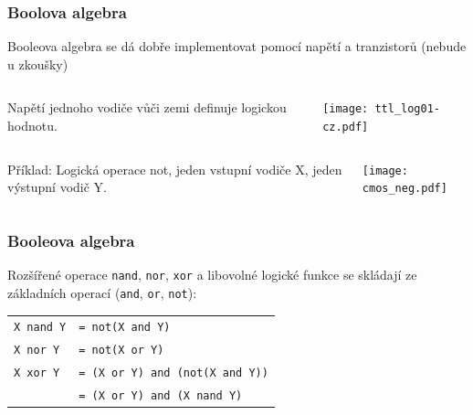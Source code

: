 \documentclass{beamer}
\begin{document}
\begin{frame}
\frametitle{Boolova algebra}

Booleova algebra se dá dobře implementovat pomocí napětí a tranzistorů (nebude u zkoušky)

\begin{columns}
\begin{column}{0.45\textwidth}
Napětí jednoho vodiče vůči zemi definuje logickou hodnotu.
\end{column}
\begin{column}{0.55\textwidth}  
\begin{center}
   \texttt{[image: ttl\_log01-cz.pdf]}
\end{center}
\end{column}
\end{columns}

\begin{columns}
\begin{column}{0.45\textwidth}
Příklad: Logická operace not, jeden vstupní vodiče X, jeden výstupní vodič Y.
\end{column}
\begin{column}{0.55\textwidth}  
\begin{center}
   \texttt{[image: cmos\_neg.pdf]}
\end{center}
\end{column}
\end{columns}


\end{frame}

\begin{frame}
\frametitle{Booleova algebra}

Rozšířené operace \texttt{nand}, \texttt{nor}, \texttt{xor} a libovolné logické funkce se skládají ze základních operací (\texttt{and}, \texttt{or}, \texttt{not}):

\begin{tabular}{ll}
\texttt{X nand Y} & \texttt{= not(X and Y)}\\
\texttt{X nor Y} & \texttt{= not(X or Y)}\\
\texttt{X xor Y} & \texttt{= (X or Y) and (not(X and Y))}\\
& \texttt{= (X or Y) and (X nand Y)}\\
\end{tabular}


\end{frame}
\end{document}
